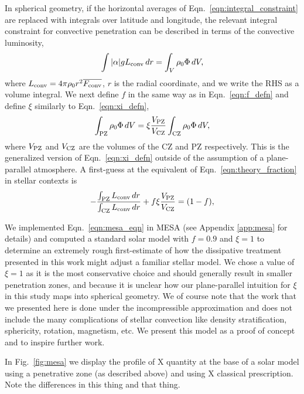 \documentclass[twocolumn]{aastex631}
\renewcommand{\bar}[1]{\overline{#1}}
\begin{document}
In spherical geometry, if the horizontal averages of Eqn.~\ref{eqn:integral_constraint} are replaced with integrals over latitude and longitude, the relevant integral constraint for convective penetration can be described in terms of the convective luminosity,
\begin{equation}
\int |\alpha| g L_{\rm{conv}}\,dr =   \int_V \rho_0 \Phi\,dV,
\end{equation}
where $L_{\rm{conv}} = 4\pi\rho_0 r^2 \bar{F_{\rm{conv}}}$, $r$ is the radial coordinate, and we write the RHS as a volume integral.
We next define $f$ in the same way as in Eqn.~\ref{eqn:f_defn} and define $\xi$ similarly to Eqn.~\ref{eqn:xi_defn},
\begin{equation}
\int_{\rm{PZ}} \rho_0 \Phi \,dV = \xi \frac{V_{\rm{PZ}}}{V_{\rm{CZ}}}\int_{\rm{CZ}}\rho_0 \Phi \, dV,
\end{equation}
where $V_{\rm{PZ}}$ and $V_{\rm{CZ}}$ are the volumes of the CZ and PZ respectively.
This is the generalized version of Eqn.~\ref{eqn:xi_defn} outside of the assumption of a plane-parallel atmosphere.
A first-guess at the equivalent of Eqn.~\ref{eqn:theory_fraction} in stellar contexts is
\begin{equation}
-\frac{\int_{\rm{PZ}} L_{\rm{conv}}\,dr}{\int_{\rm{CZ}} L_{\rm{conv}}\,dr} + f \xi \frac{V_{\rm{PZ}}}{V_{\rm{CZ}}} = (1 - f),
\label{eqn:mesa_eqn}
\end{equation}

We implemented Eqn.~\ref{eqn:mesa_eqn} in MESA (see Appendix \ref{app:mesa} for details) and computed a standard solar model with $f = 0.9$ and $\xi = 1$ to determine an extremely rough first-estimate of how the dissipative treatment presented in this work might adjust a familiar stellar model.
We chose a value of $\xi = 1$ as it is the most conservative choice and should generally result in smaller penetration zones, and because it is unclear how our plane-parallel intuition for $\xi$ in this study maps into spherical geometry.
We of course note that the work that we presented here is done under the incompressible approximation and does not include the many complications of stellar convection like density stratification, sphericity, rotation, magnetism, etc.
We present this model as a proof of concept and to inspire further work.

In Fig.~\ref{fig:mesa} we display the profile of X quantity at the base of a solar model using a penetrative zone (as described above) and using X classical prescription.
Note the differences in this thing and that thing.
\end{document}
